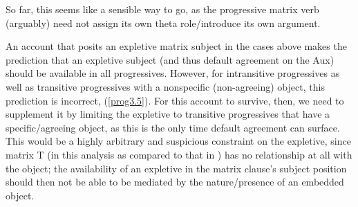 \documentclass[output=paper
,modfonts
,nonflat]{langsci/langscibook}
\begin{document}
\noindent So far, this seems like a sensible way to go, as the progressive matrix verb (arguably) need not assign its own theta role/introduce its own argument.

An account that posits an expletive matrix subject in the cases above makes the prediction that an expletive subject (and thus default agreement on the Aux) should be available in all progressives. However, for intransitive progressives as well as transitive progressives with a nonspecific (non-agreeing) object, this prediction is incorrect, (\ref{prog3.5}). For this account to survive, then, we need to supplement it by limiting the expletive to transitive progressives that have a specific/agreeing object, as this is the only time default agreement can surface. This would be a highly arbitrary and suspicious constraint on the expletive, since matrix T (in this analysis as compared to that in ) has no relationship at all with the object; the availability of an expletive in the matrix clause's subject position should then not be able to be mediated by the nature/presence of an embedded object.
\end{document}
